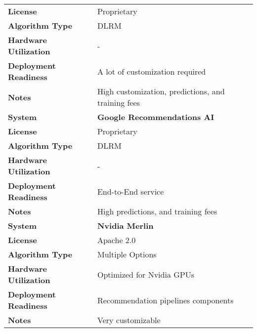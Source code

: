 \begin{table}[h]
\begin{tabular}{|l|l|}
        \cline{2-2}
        \textbf{License} & Proprietary \\
        \cline{2-2}
        \textbf{Algorithm Type} & DLRM \\
        \cline{2-2}
        \textbf{Hardware Utilization} & - \\
        \cline{2-2}
        \textbf{Deployment Readiness} & A lot of customization required  \\
        \cline{2-2}
        \textbf{Notes} & High customization, predictions, and training fees \\
        \hline
        \hline
        \textbf{System} & \textbf{Google Recommendations AI} \\
        \cline{2-2}
        \textbf{License} & Proprietary \\
        \cline{2-2}
        \textbf{Algorithm Type} & DLRM \\
        \cline{2-2}
        \textbf{Hardware Utilization} & - \\
        \cline{2-2}
        \textbf{Deployment Readiness} & End-to-End service \\
        \cline{2-2}
        \textbf{Notes} & High predictions, and training fees \\
        \hline
        \hline
        \textbf{System} & \textbf{Nvidia Merlin} \\
        \cline{2-2}
        \textbf{License} & Apache 2.0 \\
        \cline{2-2}
        \textbf{Algorithm Type} & Multiple Options  \\
        \cline{2-2}
        \textbf{Hardware Utilization} & Optimized for Nvidia GPUs \\
        \cline{2-2}
        \textbf{Deployment Readiness} & Recommendation pipelines components \\
        \cline{2-2}
        \textbf{Notes} & Very customizable \\
        \hline
    \end{tabular}
\end{table}
        
